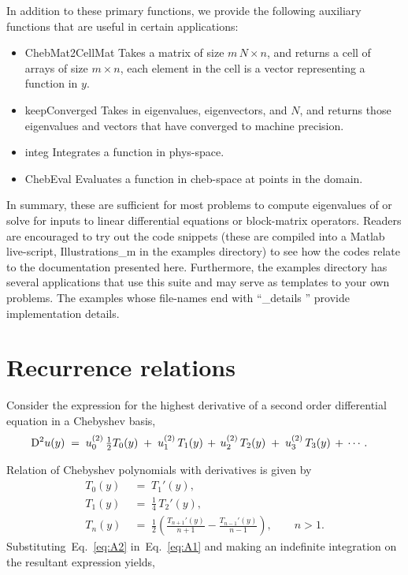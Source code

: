 \documentclass[%
secnumarabic,%
 amssymb, amsmath,%
 aps,prf,superscriptaddress,longbibliography
frontmatterverbose,
]{revtex4-2}
\begin{document}
In addition to these primary functions, we provide the following auxiliary functions that are useful in certain applications:
\begin{itemize}
  \item {\sf ChebMat2CellMat} Takes a matrix of size $m\,N \times n$, and returns a cell of arrays of size $m\times n$, each element in the cell is a vector representing a function in $y$.
  \item {\sf keepConverged} Takes in eigenvalues, eigenvectors, and $N$, and returns those eigenvalues and vectors that have converged to machine precision.
  \item {\sf integ} Integrates a function in phys-space.
  \item {\sf ChebEval} Evaluates a function in cheb-space at points in the domain.
\end{itemize}
In summary, these are sufficient for most problems to compute eigenvalues of or solve for inputs to linear differential equations or block-matrix operators. Readers are encouraged to try out the code snippets (these are compiled into a Matlab live-script, {\sf Illustrations\_m} in the examples directory) to see how the codes relate to the documentation presented here. Furthermore, the examples directory has several applications that use this suite and may serve as templates to your own problems. The examples whose file-names end with ``\_details '' provide implementation details.

  \newpage\noindent

  \appendix
\section{Recurrence relations}\label{app:ind-int}
Consider the expression for the highest derivative of a second order differential equation in a Chebyshev basis,
\begin{align}\label{eq:A1}
  \mathrm D^2 u (y) \;&=\; u_0^{(2)} \,\tfrac{1}{2}T_0(y) \;+\; u_1^{(2)}\,T_1(y) \,+\, u_2^{(2)}\,T_2(y) \;+\; u_3^{(2)}\,T_3(y) \,+\, \cdots.
\end{align}

Relation of Chebyshev polynomials with derivatives is given by~\cite[Equation 3.25]{chebExpanExact}
\begin{subequations}\label{eq:A2}
\begin{align}
  T_0(y) \;&=\; T_1'(y),\\
  T_1(y) \;&=\; \tfrac{1}{4}\,T_2'(y),\\
  T_n(y) \;&=\; \tfrac{1}{2}\left( \frac{T_{n+1}'(y)}{n+1} - \frac{T_{n-1}'(y)}{n-1}\right), \qquad n > 1.
\end{align}
\end{subequations}
Substituting~Eq.~\eqref{eq:A2} in~Eq.~\eqref{eq:A1} and making an indefinite integration on the resultant expression yields,
\end{document}
